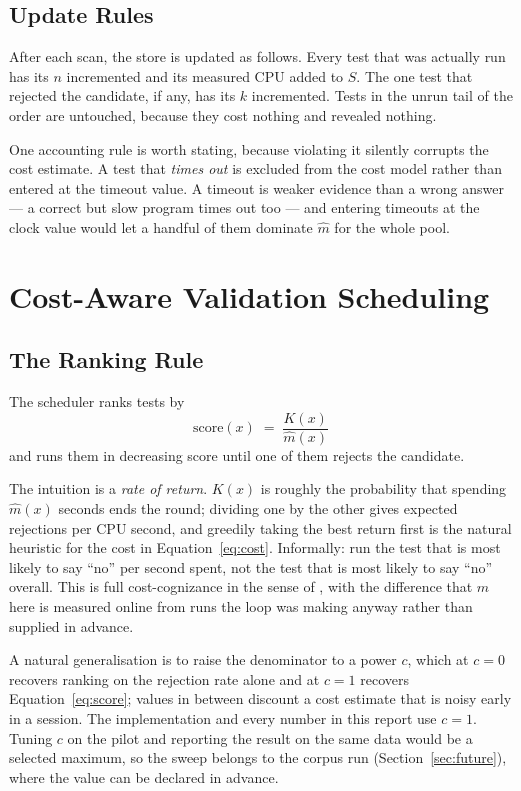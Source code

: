 \subsection{Update Rules}

After each scan, the store is updated as follows. Every test that was actually
run has its $n$ incremented and its measured CPU added to $S$. The one test that
rejected the candidate, if any, has its $k$ incremented. Tests in the unrun
tail of the order are untouched, because they cost nothing and revealed nothing.

One accounting rule is worth stating, because violating it silently corrupts the
cost estimate. A test that \emph{times out} is excluded from the cost model
rather than entered at the timeout value. A timeout is weaker evidence than a
wrong answer --- a correct but slow program times out too --- and entering
timeouts at the clock value would let a handful of them dominate $\hat{m}$ for
the whole pool.

\section{Cost-Aware Validation Scheduling}
\label{sec:schedule}

\subsection{The Ranking Rule}

The scheduler ranks tests by
\begin{equation}
\mathrm{score}(x) \;=\; \frac{K(x)}{\hat{m}(x)}
\label{eq:score}
\end{equation}
and runs them in decreasing score until one of them rejects the candidate.

The intuition is a \emph{rate of return}. $K(x)$ is roughly the probability that
spending $\hat{m}(x)$ seconds ends the round; dividing one by the other gives
expected rejections per CPU second, and greedily taking the best return first is
the natural heuristic for the cost in Equation~\eqref{eq:cost}. Informally: run
the test that is most likely to say ``no'' per second spent, not the test that
is most likely to say ``no'' overall. This is full cost-cognizance in the sense
of \citet{elbaum2001cost}, with the difference that $\hat{m}$ here is measured
online from runs the loop was making anyway rather than supplied in advance.

A natural generalisation is to raise the denominator to a power $c$, which at
$c = 0$ recovers ranking on the rejection rate alone and at $c = 1$ recovers
Equation~\eqref{eq:score}; values in between discount a cost estimate that is
noisy early in a session. The implementation and every number in this report
use $c = 1$. Tuning $c$ on the pilot and reporting the result on the same data
would be a selected maximum, so the sweep belongs to the corpus run
(Section~\ref{sec:future}), where the value can be declared in advance.

